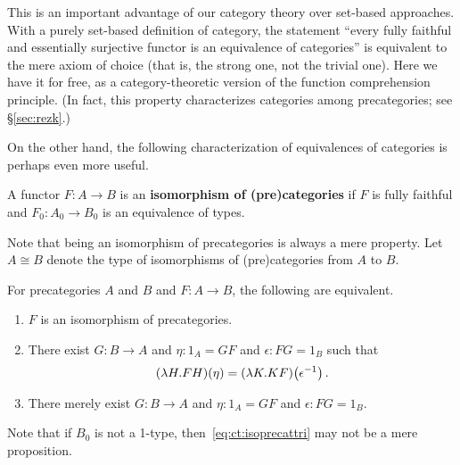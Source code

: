 This is an important advantage of our category theory over set-based approaches.
With a purely set-based definition of category, the statement ``every fully faithful and essentially surjective functor is an equivalence of categories'' is equivalent to the mere axiom of choice (that is, the strong one, not the trivial one).
Here we have it for free, as a category-theoretic version of the function comprehension principle.
(In fact, this property characterizes categories among precategories; see \S\ref{sec:rezk}.)

On the other hand, the following characterization of equivalences of categories is perhaps even more useful.

\begin{defn}\label{ct:isocat}
  A functor $F:A\to B$ is an \textbf{isomorphism of (pre)categories} if $F$ is fully faithful and $F_0:A_0\to B_0$ is an equivalence of types.
\end{defn}

Note that being an isomorphism of precategories is always a mere property.
Let $A\cong B$ denote the type of isomorphisms of (pre)categories from $A$ to $B$.

\begin{lem}\label{ct:isoprecat}
  For precategories $A$ and $B$ and $F:A\to B$, the following are equivalent.
  \begin{enumerate}
  \item $F$ is an isomorphism of precategories.\label{item:ct:ipc1}
  \item There exist $G:B\to A$ and $\eta:1_A = GF$ and $\epsilon:FG=1_B$ such that\label{item:ct:ipc2}
    \begin{equation}
      {(\lambda H. F H)}\!\left({\eta}\right) = {(\lambda K. K F)}\!\left({\mathord{{\epsilon}^{-1}}}\right).\label{eq:ct:isoprecattri}
    \end{equation}
  \item There merely exist $G:B\to A$ and $\eta:1_A = GF$ and $\epsilon:FG=1_B$.\label{item:ct:ipc3}
  \end{enumerate}
\end{lem}

Note that if $B_0$ is not a 1-type, then~\eqref{eq:ct:isoprecattri} may not be a mere proposition.

